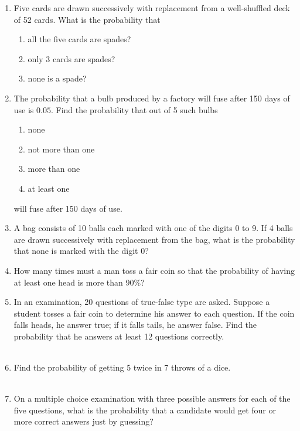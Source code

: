 \begin{enumerate}[label=\thesection.\arabic*,ref=\thesection.\theenumi]
	\\
\solution

\item Five cards are drawn successively with replacement from a well-shuffled deck
of 52 cards. What is the probability that
\begin{enumerate}
    \item all the five cards are spades?
    \item only 3 cards are spades?
    \item none is a spade?
\end{enumerate}
\solution

\item The probability that a bulb produced by a factory will fuse after 150 days of use
is $0.05$. Find the probability that out of 5 such bulbs
\begin{enumerate}
\item  none
\item not more than one
\item more than one
\item at least one
\end{enumerate}
will fuse after 150 days of use.
\\
\solution

\item A bag consists of 10 balls each marked with one of the digits 0 to 9. If 4 balls are drawn successively with replacement from the bag, what is the probability that none is marked with the digit 0?
\\
\solution

\item How many times must a man toss a fair coin so that the probability of having at least one head is more than 90\%?
\\

\item In an examination, 20 questions of true-false type are asked. Suppose a student tosses a fair coin to determine his answer to each question. If the coin falls heads, he answer true; if it falls tails, he answer false. Find the probability that he answers at least 12 questions correctly.\\
\\
\solution

\item Find the probability of getting 5 twice in 7 throws of a dice.\\
\\
\solution

\item On a multiple choice examination with three possible answers for each of the five questions, what is the probability that a candidate would get four or more correct answers just by guessing$?$

\end{enumerate}
